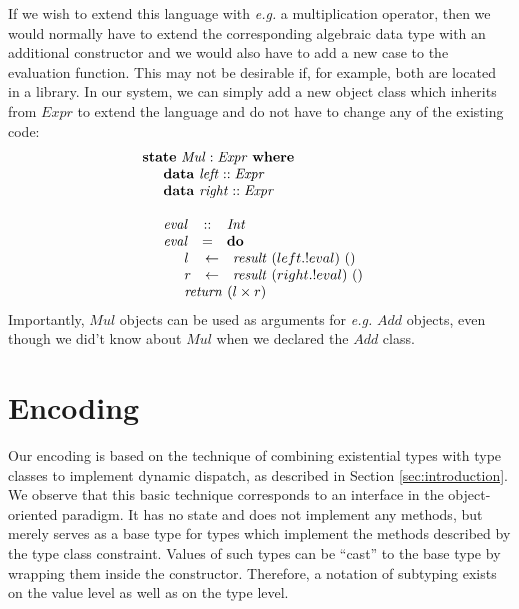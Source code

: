 \documentclass[authoryear,preprint]{sigplanconf}
\begin{document}
If we wish to extend this language with \emph{e.g.} a multiplication operator, then we would normally have to extend the corresponding algebraic data type with an additional constructor and we would also have to add a new case to the evaluation function. This may not be desirable if, for example, both are located in a library. In our system, we can simply add a new object class which inherits from $\mathit{Expr}$ to extend the language and do not have to change any of the existing code:
\begin{displaymath}
\begin{array}{l}
\mathbf{state}~\mathit{Mul} : \mathit{Expr}~\mathbf{where} \\
\quad \begin{array}{lcl}
\multicolumn{3}{l}{\mathbf{data}~\mathit{left}  :: \mathit{Expr}} \\
\multicolumn{3}{l}{\mathbf{data}~\mathit{right}  :: \mathit{Expr}} \\\\
\mathit{eval} & :: & \mathit{Int} \\
\mathit{eval} & = & \mathbf{do} \\
\multicolumn{3}{l}{\quad \begin{array}{lcl}
    l & \leftarrow & \mathit{result}~(left.!eval)~() \\
    r & \leftarrow & \mathit{result}~(right.!eval)~() \\
    \multicolumn{3}{l}{\mathit{return}~(l \times r)}
    \end{array}} 
\end{array}
\end{array}
\end{displaymath}
Importantly, $\mathit{Mul}$ objects can be used as arguments for \emph{e.g.} $\mathit{Add}$ objects, even though we did't know about $\mathit{Mul}$ when we declared the $\mathit{Add}$ class.

\section{Encoding}
\label{sec:encoding}

Our encoding is based on the technique of combining existential types with type classes to implement dynamic dispatch, as described in Section \ref{sec:introduction}. We observe that this basic technique corresponds to an interface in the object-oriented paradigm. It has no state and does not implement any methods, but merely serves as a base type for types which implement the methods described by the type class constraint. Values of such types can be ``cast'' to the base type by wrapping them inside the constructor. Therefore, a notation of subtyping exists on the value level as well as on the type level.
\end{document}
